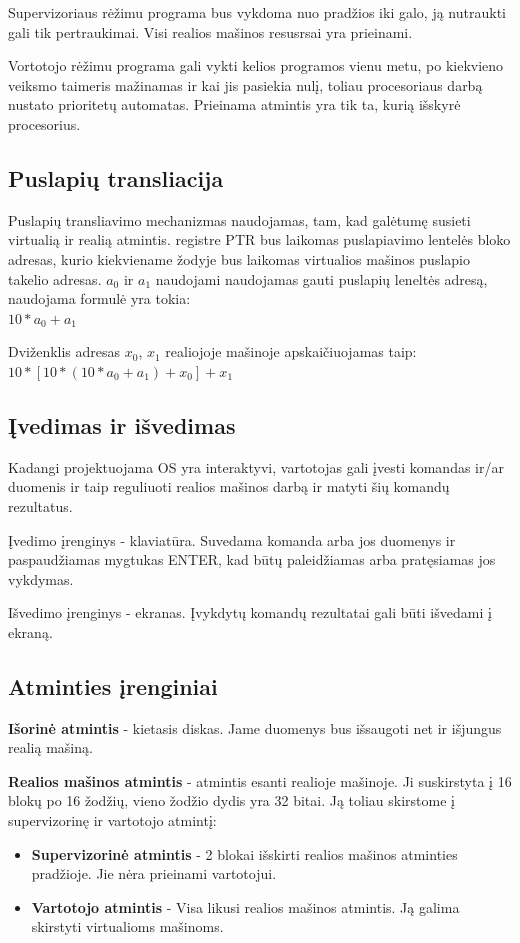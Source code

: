 	Supervizoriaus rėžimu programa bus vykdoma nuo pradžios iki galo, ją nutraukti gali tik pertraukimai. Visi realios mašinos resusrsai yra prieinami.
	
	Vortotojo rėžimu programa gali vykti kelios programos vienu metu, po kiekvieno veiksmo taimeris mažinamas ir kai jis pasiekia nulį, toliau procesoriaus darbą nustato prioritetų automatas. Prieinama atmintis yra tik ta, kurią išskyrė procesorius.
	
	\subsection{Puslapių transliacija}
	Puslapių transliavimo mechanizmas naudojamas, tam, kad galėtumę susieti virtualią ir realią atmintis. registre PTR bus laikomas puslapiavimo lentelės bloko adresas, kurio kiekviename žodyje bus laikomas virtualios mašinos puslapio takelio adresas. 
	\(a_0\) ir \(a_1\) naudojami naudojamas gauti puslapių leneltės adresą, naudojama formulė yra tokia:\\ \(10 * a_0 + a_1\)
	
	Dviženklis adresas \(x_0\), \(x_1\) realiojoje mašinoje apskaičiuojamas taip:\\ \(10 * [10 *(10 * a_0 + a_1) + x_0] + x_1\)  
	
	\subsection{Įvedimas ir išvedimas}
	Kadangi projektuojama OS yra interaktyvi, vartotojas gali įvesti komandas ir/ar duomenis ir taip reguliuoti realios mašinos darbą ir matyti šių komandų rezultatus.
	
	Įvedimo įrenginys - klaviatūra. Suvedama komanda arba jos duomenys ir paspaudžiamas mygtukas ENTER, kad būtų paleidžiamas arba pratęsiamas jos vykdymas.
	
	Išvedimo įrenginys - ekranas. Įvykdytų komandų rezultatai gali būti išvedami į ekraną.
	
	\subsection{Atminties įrenginiai}
	\textbf{Išorinė atmintis} - kietasis diskas. Jame duomenys bus išsaugoti net ir išjungus realią mašiną. 
	
	\textbf{Realios mašinos atmintis} - atmintis esanti realioje mašinoje. Ji suskirstyta į 16 blokų po 16 žodžių, vieno žodžio dydis yra 32 bitai. Ją toliau skirstome į supervizorinę ir vartotojo atmintį:
	\begin{itemize}
	\item \textbf{Supervizorinė atmintis} - 2 blokai išskirti realios mašinos atminties pradžioje. Jie nėra prieinami vartotojui.
	\item \textbf{Vartotojo atmintis} - Visa likusi realios mašinos atmintis. Ją galima skirstyti virtualioms mašinoms.
	\end{itemize}
	
